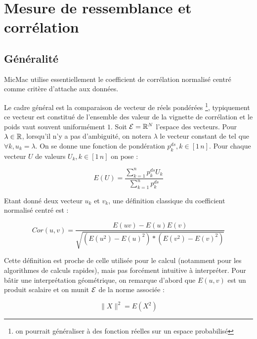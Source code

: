 \chapter{Mesure de ressemblance et corr\'elation}

\label{CHAP:COREL}


\section{G\'en\'eralit\'e}

MicMac utilise essentiellement le coefficient de corr\'elation
normalis\'e centr\'e comme crit\`ere d'attache aux donn\'ees.

Le cadre g\'en\'eral est la comparaison de vecteur de r\'eels
pond\'er\'ees \footnote{on pourrait g\'en\'eraliser
\`a des fonction r\'eelles sur un espace probabilis\'e}, typiquement
ce vecteur est constitu\'e de l'ensemble des valeur de la vignette
de corr\'elation et le poids vaut souvent uniform\'ement $1$.
Soit  $\Echant=\RR^N$ l'espace des vecteurs.
Pour  $\lambda \in \RR$, lorsqu'il n'y a pas d'ambiguit\'e,
  on notera  $\lambda$ le vecteur
constant de \Echant  tel que $\forall k, u_k=\lambda $.
On se donne une fonction de pond\'eration $p^{ds}_k ,k\in[1 \, n]$.
Pour chaque  vecteur $U$ de valeurs $U_k, k \in [1 \, n]$ on pose :

\begin{equation}
   E(U) =  \frac{\sum^n_{k=1} p^{ds}_k U_k}{\sum^n_{k=1}  p^{ds}_k}
\end{equation}

Etant donn\'e deux  vecteur $u_k$ et $v_k$, une d\'efinition classique du
coefficient normalis\'e centr\'e est :

\begin{equation}
   Cor(u,v) =  \frac{E(uv)-E(u)E(v)}{\sqrt{(E(u^2)-E(u)^2)*(E(v^2)-E(v)^2)}}
\end{equation}

Cette d\'efinition est proche de celle utilis\'ee pour le calcul
(notamment pour les algorithmes de calculs rapides), mais pas forc\'ement intuitive
\`a interpr\'eter. Pour b\^atir une interpr\'etation
g\'eom\'etrique, on remarque d'abord que $E(u,v)$ est un produit scalaire et
on munit $\Echant$  de la norme associ\'ee :

\begin{equation}
   \| X \|^2 =  E(X^2)
\end{equation}

